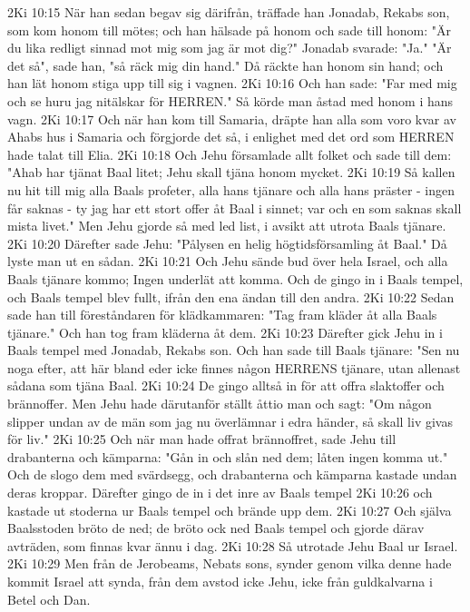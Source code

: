 2Ki 10:15  När han sedan begav sig därifrån, träffade han Jonadab, Rekabs son, som kom honom till mötes; och han hälsade på honom och sade till honom: "Är du lika redligt sinnad mot mig som jag är mot dig?" Jonadab svarade: "Ja." "Är det så", sade han, "så räck mig din hand." Då räckte han honom sin hand; och han lät honom stiga upp till sig i vagnen.
2Ki 10:16  Och han sade: "Far med mig och se huru jag nitälskar för HERREN." Så körde man åstad med honom i hans vagn.
2Ki 10:17  Och när han kom till Samaria, dräpte han alla som voro kvar av Ahabs hus i Samaria och förgjorde det så, i enlighet med det ord som HERREN hade talat till Elia.
2Ki 10:18  Och Jehu församlade allt folket och sade till dem: "Ahab har tjänat Baal litet; Jehu skall tjäna honom mycket.
2Ki 10:19  Så kallen nu hit till mig alla Baals profeter, alla hans tjänare och alla hans präster - ingen får saknas - ty jag har ett stort offer åt Baal i sinnet; var och en som saknas skall mista livet." Men Jehu gjorde så med led list, i avsikt att utrota Baals tjänare.
2Ki 10:20  Därefter sade Jehu: "Pålysen en helig högtidsförsamling åt Baal." Då lyste man ut en sådan.
2Ki 10:21  Och Jehu sände bud över hela Israel, och alla Baals tjänare kommo; Ingen underlät att komma. Och de gingo in i Baals tempel, och Baals tempel blev fullt, ifrån den ena ändan till den andra.
2Ki 10:22  Sedan sade han till föreståndaren för klädkammaren: "Tag fram kläder åt alla Baals tjänare." Och han tog fram kläderna åt dem.
2Ki 10:23  Därefter gick Jehu in i Baals tempel med Jonadab, Rekabs son. Och han sade till Baals tjänare: "Sen nu noga efter, att här bland eder icke finnes någon HERRENS tjänare, utan allenast sådana som tjäna Baal.
2Ki 10:24  De gingo alltså in för att offra slaktoffer och brännoffer. Men Jehu hade därutanför ställt åttio man och sagt: "Om någon slipper undan av de män som jag nu överlämnar i edra händer, så skall liv givas för liv."
2Ki 10:25  Och när man hade offrat brännoffret, sade Jehu till drabanterna och kämparna: "Gån in och slån ned dem; låten ingen komma ut." Och de slogo dem med svärdsegg, och drabanterna och kämparna kastade undan deras kroppar. Därefter gingo de in i det inre av Baals tempel
2Ki 10:26  och kastade ut stoderna ur Baals tempel och brände upp dem.
2Ki 10:27  Och själva Baalsstoden bröto de ned; de bröto ock ned Baals tempel och gjorde därav avträden, som finnas kvar ännu i dag.
2Ki 10:28  Så utrotade Jehu Baal ur Israel.
2Ki 10:29  Men från de Jerobeams, Nebats sons, synder genom vilka denne hade kommit Israel att synda, från dem avstod icke Jehu, icke från guldkalvarna i Betel och Dan.
